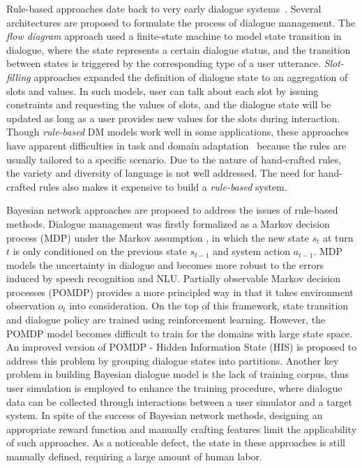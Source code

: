 Rule-based approaches date back to very early dialogue systems~\cite{weizenbaum1966eliza}. Several architectures are proposed to formulate the process of dialogue management. The \emph{flow diagram} approach \cite{mctear1998modelling} used a finite-state machine to model state transition in dialogue, where the state represents a certain dialogue status, and the transition between states is triggered by the corresponding type of a user utterance.  \emph{Slot-filling} approaches \cite{goddeau1996form} expanded the definition of dialogue state to an aggregation of slots and values. In such models, user can talk about each slot by issuing constraints and requesting the values of slots, and the dialogue state will be updated as long as a user provides new values for the slots during interaction.
Though \emph{rule-based} DM models work well in some applications, these approaches have apparent difficulties in task and domain adaptation~\cite{zukerman2001predictive} because the rules are usually tailored to a specific scenario. Due to the nature of hand-crafted rules, the variety and diversity of language is not well addressed. The need for hand-crafted rules also makes it expensive to build a {\em rule-based} system. 

Bayesian network approaches are proposed to address the issues of rule-based methods. Dialogue management was firstly formalized as a Markov decision process (MDP) \cite{levin1998using} under the Markov assumption \cite{paek2005markov}, in which the new state $s_t$ at turn $t$ is only conditioned on the previous state $s_{t-1}$ and system action $a_{t-1}$. MDP models the uncertainty in dialogue and becomes more robust to the errors induced by speech recognition and NLU. Partially observable Markov decision processes (POMDP) \cite{williams2007partially} provides a more principled way in that it takes environment observation $o_t$ into consideration. On the top of this framework, state transition and dialogue policy are trained using reinforcement learning. However, the POMDP model becomes difficult to train for the domains with large state space. An improved version of POMDP - Hidden Information State (HIS)  \cite{young2007hidden} is proposed to address this problem by grouping dialogue states into partitions. Another key problem in building Bayesian dialogue model is the lack of training corpus, thus user simulation \cite{schatzmann2006survey} is employed to enhance the training procedure, where dialogue data can be collected through interactions between a user simulator and a target system.
In spite of the success of Bayesian network methods, designing an appropriate reward function and manually crafting features limit the applicability of such approaches. As a noticeable defect, the state in these approaches is still manually defined, requiring a large amount of human labor.

